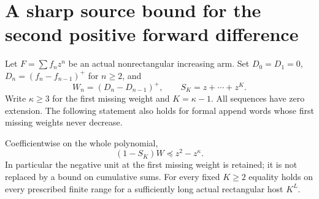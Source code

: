 \section{A sharp source bound for the second positive forward difference}
Let $F=\sum f_nz^n$ be an actual nonrectangular increasing arm.
Set $D_0=D_1=0$, $D_n=(f_n-f_{n-1})^+$ for $n\ge2$, and
\[
 W_n=(D_n-D_{n-1})^+,\qquad S_K=z+\cdots+z^K.
\]
Write $\kappa\ge3$ for the first missing weight and $K=\kappa-1$.
All sequences have zero extension. The following statement also
holds for formal append words whose first missing weights never decrease.

\begin{theorem}
Coefficientwise on the whole polynomial,
\[
                  (1-S_K)W\preceq z^2-z^\kappa.       \tag{1}
\]
In particular the negative unit at the first missing weight is
retained; it is not replaced by a bound on cumulative sums.
For every fixed $K\ge2$ equality holds on every prescribed finite
range for a sufficiently long actual rectangular host $K^L$.
\end{theorem}

